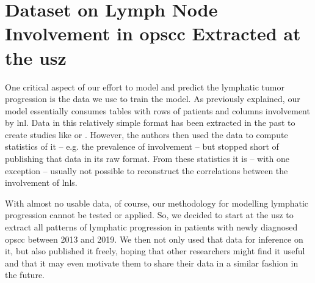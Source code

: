 \documentclass[\relativeRoot/main.tex]{subfiles}
\begin{document}
\chapter[
    USZ Dataset on Lymph Node Involvement in OPSCC
]{
    Dataset on Lymph Node Involvement in \acrlong{opscc} Extracted at the \gls{usz}
}
\label{chap:dataset_usz}



One critical aspect of our effort to model and predict the lymphatic tumor progression is the data we use to train the model. As previously explained, our model essentially consumes tables with rows of patients and columns involvement by \gls{lnl}. Data in this relatively simple format has been extracted in the past to create studies like \cite{candela_patterns_1990} or \cite{shah_patterns_1990}. However, the authors then used the data to compute statistics of it -- e.g. the prevalence of involvement -- but stopped short of publishing that data in its raw format. From these statistics it is -- with one exception \cite{sanguineti_defining_2009} -- usually not possible to reconstruct the correlations between the involvement of \glspl{lnl}.

With almost no usable data, of course, our methodology for modelling lymphatic progression cannot be tested or applied. So, we decided to start at the \gls{usz} to extract all patterns of lymphatic progression in patients with newly diagnosed \gls{opscc} between 2013 and 2019. We then not only used that data for inference on it, but also published it freely, hoping that other researchers might find it useful and that it may even motivate them to share their data in a similar fashion in the future.






\end{document}
